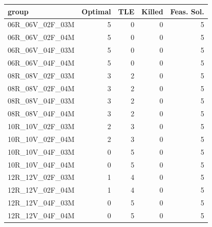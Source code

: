 
\begin{tabular}{lrrrr}
\toprule
group & Optimal & TLE & Killed & Feas. Sol.\\
\midrule
06R\_06V\_02F\_03M & 5 & 0 & 0 & 5\\
06R\_06V\_02F\_04M & 5 & 0 & 0 & 5\\
06R\_06V\_04F\_03M & 5 & 0 & 0 & 5\\
06R\_06V\_04F\_04M & 5 & 0 & 0 & 5\\
08R\_08V\_02F\_03M & 3 & 2 & 0 & 5\\
\addlinespace
08R\_08V\_02F\_04M & 3 & 2 & 0 & 5\\
08R\_08V\_04F\_03M & 3 & 2 & 0 & 5\\
08R\_08V\_04F\_04M & 3 & 2 & 0 & 5\\
10R\_10V\_02F\_03M & 2 & 3 & 0 & 5\\
10R\_10V\_02F\_04M & 2 & 3 & 0 & 5\\
\addlinespace
10R\_10V\_04F\_03M & 0 & 5 & 0 & 5\\
10R\_10V\_04F\_04M & 0 & 5 & 0 & 5\\
12R\_12V\_02F\_03M & 1 & 4 & 0 & 5\\
12R\_12V\_02F\_04M & 1 & 4 & 0 & 5\\
12R\_12V\_04F\_03M & 0 & 5 & 0 & 5\\
\addlinespace
12R\_12V\_04F\_04M & 0 & 5 & 0 & 5\\
\bottomrule
\end{tabular}
